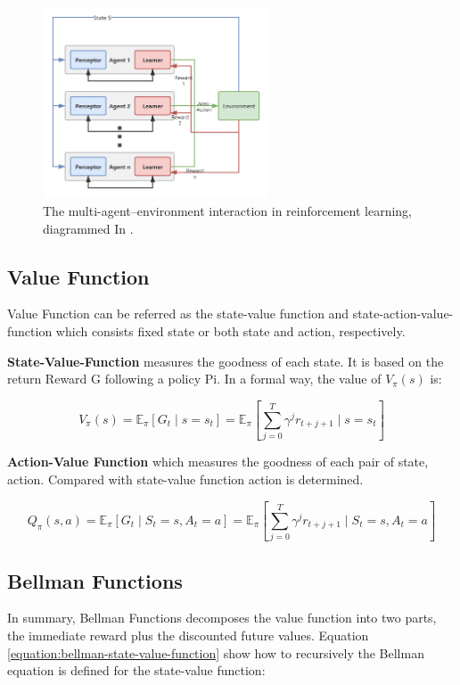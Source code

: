 \begin{figure}[htbp]
\centering
\includegraphics[width=0.6\textwidth]{./images/multi-agent-environment-interaction.png}
\caption{The multi-agent–environment interaction in reinforcement learning, diagrammed In \parencite{en13010123}.}
\label{fig:multi-agent-environment-interaction}
\end{figure}

\subsection{Value Function}
Value Function can be referred as the state-value function and state-action-value-function which consists fixed state or both state and action, respectively.

\textbf{State-Value-Function} measures the goodness of each state. It is based on the return Reward G following a policy Pi. In a formal way, the value of $V_\pi(s)$ is:

\begin{equation} 
V_{\pi}(s)=\mathbb{E}_{\pi}\left[G_{t} \mid s=s_{t}\right]=\mathbb{E}_{\pi}\left[\sum_{j=0}^{T} \gamma^{j} r_{t+j+1} \mid s=s_{t}\right]
\end{equation}

\textbf{Action-Value Function} which measures the goodness of each pair of state, action. Compared with state-value function action is determined.

\begin{equation}
Q_{\pi}(s, a)=\mathbb{E}_{\pi}\left[G_{t} \mid S_{t}=s, A_{t}=a\right]=\mathbb{E}_{\pi}\left[\sum_{j=0}^{T} \gamma^{j} r_{t+j+1} \mid S_{t}=s, A_{t}=a\right]
\end{equation}

\subsection{Bellman Functions}
In summary, Bellman Functions decomposes the value function into two parts, the immediate reward plus the discounted future values. Equation \ref{equation:bellman-state-value-function} show how to recursively the Bellman equation is defined for the state-value function:

